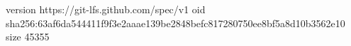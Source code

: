 version https://git-lfs.github.com/spec/v1
oid sha256:63af6da544411f9f3e2aaae139be2848befc817280750ee8bf5a8d10b3562e10
size 45355
